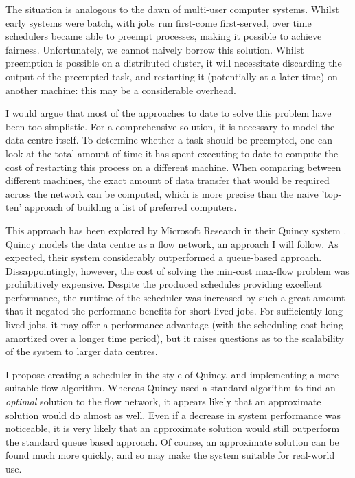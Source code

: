 The situation is analogous to the dawn of multi-user computer systems. Whilst early systems were batch, with jobs run first-come first-served, over time schedulers became able to preempt processes, making it possible to achieve fairness. Unfortunately, we cannot naively borrow this solution. Whilst preemption is possible on a distributed cluster, it will necessitate discarding the output of the preempted task, and restarting it (potentially at a later time) on another machine: this may be a considerable overhead.

I would argue that most of the approaches to date to solve this problem have been too simplistic. For a comprehensive solution, it is necessary to model the data centre itself. To determine whether a task should be preempted, one can look at the total amount of time it has spent executing to date to compute the cost of restarting this process on a different machine. When comparing between different machines, the exact amount of data transfer that would be required across the network can be computed, which is more precise than the naive 'top-ten' approach of building a list of preferred computers. 

This approach has been explored by Microsoft Research in their Quincy system \cite{Isard:2009}. Quincy models the data centre as a flow network, an approach I will follow. As expected, their system considerably outperformed a queue-based approach. Dissappointingly, however, the cost of solving the min-cost max-flow problem was prohibitively expensive. Despite the produced schedules providing excellent performance, the runtime of the scheduler was increased by such a great amount that it negated the performanc benefits for short-lived jobs. For sufficiently long-lived jobs, it may offer a performance advantage (with the scheduling cost being amortized over a longer time period), but it raises questions as to the scalability of the system to larger data centres.

I propose creating a scheduler in the style of Quincy, and implementing a more suitable flow algorithm. Whereas Quincy used a standard algorithm to find an \emph{optimal} solution to the flow network, it appears likely that an approximate solution would do almost as well. Even if a decrease in system performance was noticeable, it is very likely that an approximate solution would still outperform the standard queue based approach. Of course, an approximate solution can be found much more quickly, and so may make the system suitable for real-world use. 

